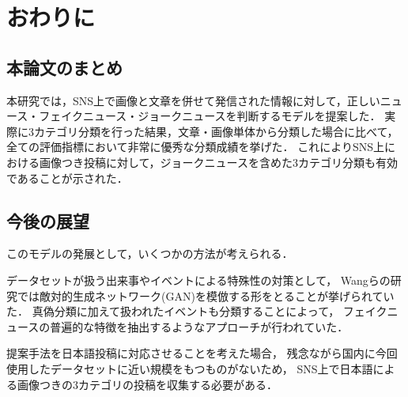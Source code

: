 %
\section{おわりに}\label{ch:conclusion}
%
\subsection{本論文のまとめ}
本研究では，SNS上で画像と文章を併せて発信された情報に対して，正しいニュース・フェイクニュース・ジョークニュースを判断するモデルを提案した．
実際に3カテゴリ分類を行った結果，文章・画像単体から分類した場合に比べて，全ての評価指標において非常に優秀な分類成績を挙げた．
これによりSNS上における画像つき投稿に対して，ジョークニュースを含めた3カテゴリ分類も有効であることが示された．
%
\subsection{今後の展望}
このモデルの発展として，いくつかの方法が考えられる．

データセットが扱う出来事やイベントによる特殊性の対策として，
Wangらの研究\cite{Wang:2018:EEA:3219819.3219903}では敵対的生成ネットワーク(GAN)を模倣する形をとることが挙げられていた．
真偽分類に加えて扱われたイベントも分類することによって，
フェイクニュースの普遍的な特徴を抽出するようなアプローチが行われていた．

提案手法を日本語投稿に対応させることを考えた場合，
残念ながら国内に今回使用したデータセットに近い規模をもつものがないため，
SNS上で日本語による画像つきの3カテゴリの投稿を収集する必要がある．
% 